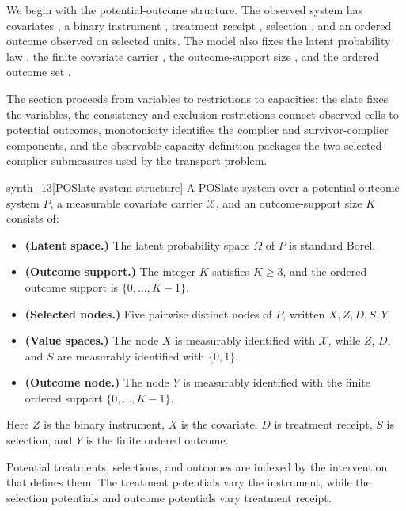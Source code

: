 \documentclass[11pt]{article}
\begin{document}
We begin with the potential-outcome structure. The observed system has covariates , a binary instrument , treatment receipt , selection , and an ordered outcome  observed on selected units. The model also fixes the latent probability law , the finite covariate carrier , the outcome-support size , and the ordered outcome set .

The section proceeds from variables to restrictions to capacities: the slate fixes the variables, the consistency and exclusion restrictions connect observed cells to potential outcomes, monotonicity identifies the complier and survivor-complier components, and the observable-capacity definition packages the two selected-complier submeasures used by the transport problem.

\begin{definitionv}{synth_13}[POSlate system structure]
A POSlate system over a potential-outcome system \(P\), a measurable covariate carrier \(\mathcal X\), and an outcome-support size \(K\) consists of:
\begin{itemize}
\item \textbf{(Latent space.)} The latent probability space \(\Omega\) of \(P\) is standard Borel.
\item \textbf{(Outcome support.)} The integer \(K\) satisfies \(K\ge 3\), and the ordered outcome support is \(\{0,\ldots,K-1\}\).
\item \textbf{(Selected nodes.)} Five pairwise distinct nodes of \(P\), written \(X,Z,D,S,Y\).
\item \textbf{(Value spaces.)} The node \(X\) is measurably identified with \(\mathcal X\), while \(Z\), \(D\), and \(S\) are measurably identified with \(\{0,1\}\).
\item \textbf{(Outcome node.)} The node \(Y\) is measurably identified with the finite ordered support \(\{0,\ldots,K-1\}\).
\end{itemize}
Here \(Z\) is the binary instrument, \(X\) is the covariate, \(D\) is treatment receipt, \(S\) is selection, and \(Y\) is the finite ordered outcome.
\end{definitionv}

Potential treatments, selections, and outcomes are indexed by the intervention that defines them. The treatment potentials  vary the instrument, while the selection potentials  and outcome potentials  vary treatment receipt.
\end{document}
